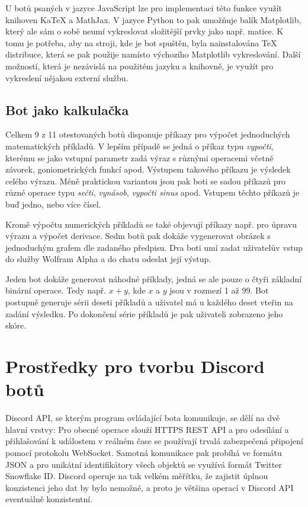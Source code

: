 \documentclass[FM]{tulthesis}
\begin{document}
	U botů psaných v jazyce JavaScript lze pro implementaci této funkce využít knihoven KaTeX a MathJax. V jazyce Python to pak umožňuje balík Matplotlib, který ale sám o sobě neumí vykreslovat složitější prvky jako např. matice. K tomu je potřeba, aby na stroji, kde je bot spuštěn, byla nainstalována TeX distribuce, která se pak použije namísto výchozího Matplotlib vykreslování. Další možností, která je nezávislá na použitém jazyku a knihovně, je využít pro vykreslení nějakou externí službu.
	
	\section{Bot jako kalkulačka}
	
	Celkem 9 z 11 otestovaných botů disponuje příkazy pro výpočet jednoduchých matematických příkladů. V lepším případě se jedná o příkaz typu \textit{vypočti}, kterému se jako vstupní parametr zadá výraz s různými operacemi včetně závorek, goniometrických funkcí apod. Výstupem takového příkazu je výsledek celého výrazu. Méně praktickou variantou jsou pak boti se sadou příkazů pro různé operace typu \textit{sečti}, \textit{vynásob}, \textit{vypočti sinus} apod. Vstupem těchto příkazů je buď jedno, nebo více čísel.
	
	Kromě výpočtu numerických příkladů se také objevují příkazy např. pro úpravu výrazu a výpočet derivace. Sedm botů pak dokáže vygenerovat obrázek s jednoduchým grafem dle zadaného předpisu. Dva boti umí zadat uživatelův vstup do služby Wolfram Alpha a do chatu odeslat její výstup.
	
	Jeden bot dokáže generovat náhodné příklady, jedná se ale pouze o čtyři základní binární operace. Tedy např. $x+y$, kde $x$ a $y$ jsou v rozmezí 1 až 99. Bot postupně generuje sérii deseti příkladů a uživatel má u každého deset vteřin na zadání výsledku. Po dokončení série příkladů je pak uživateli zobrazeno jeho skóre.
	
	
	\chapter{Prostředky pro tvorbu Discord botů}\label{Chapter4}
		
	Discord API, se kterým program ovládající bota komunikuje, se dělí na dvě hlavní vrstvy: Pro obecné operace slouží HTTPS REST API a pro odesílání a přihlašování k událostem v reálném čase se používají trvalá zabezpečená připojení pomocí protokolu WebSocket. Samotná komunikace pak probíhá ve formátu JSON a pro unikátní identifikátory všech objektů se využívá formát Twitter Snowflake ID. \mbox{Discord} operuje na tak velkém měřítku, že zajistit úplnou konzistenci jeho dat by bylo nemožné, a proto je většina operací v Discord API eventuálně konzistentní. \cite{doc_Discord}
	
\end{document}
